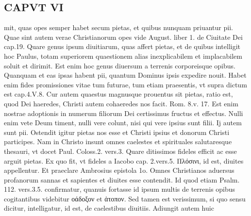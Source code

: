 \documentclass{article}
\begin{document}
\begin{pages}
\section*{CAPVT VI }
\marginpar{[ p.437 ]}\pstart mit, quas opes semper habet secum pietas, et quibus nunquam priuantur pii. Quae sint autem verae Christianorum opes vide August. liber 1. de Ciuitate Dei cap.19. Quare genus ipsum diuitiarum, quas affert pietas, et de quibus intelligit hoc Paulus, totam superiorem quaestionem alias inexplicabilem et implacabilem soluit et dirimit. Est enim hoc genus diuersum a terrenis corporeisque opibus. Quanquam et eas ipsas habent pii, quantum Dominus ipsis expedire nouit. Habet enim fides promissiones vitae tum futurae, tum etiam praesentis, vt supra dictum est cap.4.V.8.  \pend\pstart Cur autem quaestus magnusque prouentus sit pietas, ratio est, quod Dei haeredes, Christi autem cohaeredes nos facit. Rom. 8.v. 17. Est enim nostrae adoptionis in numerum filiorum Dei certissimus fructus et effectus. Nulli enim vete Deum timent, nulli vere colunt, nisi qui vere ipsius sunt filii. Ij autem sunt pii. Ostendit igitur pietas nos esse et Christi ipsius et donorum Christi participes. Nam in Christo insunt omnes caelestes et spirituales salutaresque thesauri, vt docet Paul. Coloss.2. vers.3. Quare ditissimos fideles efficit ac esse arguit pietas. Ex quo fit, vt fideles a Iacobo cap. 2.vers.5. Πλόσινι, id est, diuites appellentur. Et praeclare Ambrosius epistola 1o. Omnes Christianos aduersus profanorum sannas et sapientes et diuites esse contendit. Id quod etiam Psalm. 112. vers.3.5. confirmatur, quanuis fortasse id ipsum multis de terrenis opibus cogitantibus videbitur οάδοξον et ἀτοπον. Sed tamen est verissimum, si quo sensu dicitur, intelligatur, id est, de caelestibus diuitiis. Adiungit autem huic  \pend

\end{pages}
\end{document}

